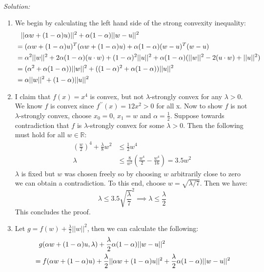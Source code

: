 \documentclass[
10pt, %
a4paper, %
oneside, %
headinclude,footinclude, %
BCOR5mm, %
]{scrartcl}
\newenvironment{solution}
               {\textit{Solution:}}
               {}
\begin{document}
\begin{solution}
  \begin{enumerate}[label=(\alph*)]
      \item We begin by calculating the left hand side of the strong convexity inequality:
        \begin{align*}
        &\hphantom{=} ||\alpha w + (1-\alpha)u)||^2 + \alpha(1-\alpha)||w-u||^2 \\
        &= (\alpha w + (1-\alpha)u)^T(\alpha w + (1-\alpha)u) + \alpha(1-\alpha)(w-u)^T(w-u) \\
        &= \alpha^2||w||^2 + 2\alpha(1-\alpha)(u\cdot w) + (1-\alpha)^2||u||^2 + \alpha(1-\alpha)(||w||^2 - 2(u\cdot w) + ||u||^2) \\
        &= (\alpha^2+\alpha(1-\alpha))||w||^2 + ((1-\alpha)^2 + \alpha(1-\alpha))||u||^2 \\
        &= \alpha||w||^2 + (1-\alpha)||u||^2
        \end{align*}
      \item I claim that $f(x) = x^4$ is convex, but not $\lambda$-strongly convex for any $\lambda>0$. We know $f$ is convex since $f^{\prime\prime}(x) = 12x^2 > 0$ for all x.
        Now to show $f$ is not $\lambda$-strongly convex, choose $x_0=0$, $x_1=w$ and $\alpha=\frac{1}{2}$. Suppose towards contradiction that $f$ is $\lambda$-strongly convex for some $\lambda > 0$. Then the following must hold for all $w\in\mathbb{R}$:
        \begin{align*}
          \left(\frac{w}{2}\right)^4 + \frac{\lambda}{8}w^2 &\leq \frac{1}{2}w^4 \\
          \lambda &\leq \frac{8}{w^2}\left(\frac{w^4}{2} - \frac{w^4}{16}\right) = 3.5w^2
        \end{align*}
        $\lambda$ is fixed but $w$ was chosen freely so by choosing $w$ arbitrarily close to zero we can obtain a contradiction. To this end, choose $w = \sqrt{\lambda/7}$. Then we have:
        $$\lambda \leq 3.5\sqrt{\frac{\lambda}{7}}^2 \implies \lambda \leq \frac{\lambda}{2} $$
        This concludes the proof.
      \item Let $g = f(w) + \frac{\lambda}{2}||w||^2$, then we can calculate the following: \begin{align*}
        &\hphantom{=} g(\alpha w + (1-\alpha)u, \lambda) + \frac{\lambda}{2}\alpha(1-\alpha)||w-u||^2 \\
        &= f(\alpha w + (1-\alpha)u) + \frac{\lambda}{2}||\alpha w + (1-\alpha) u||^2 + \frac{\lambda}{2}\alpha(1-\alpha)||w-u||^2 \\

\end{align*}
\end{enumerate}
\end{solution}
\end{document}

